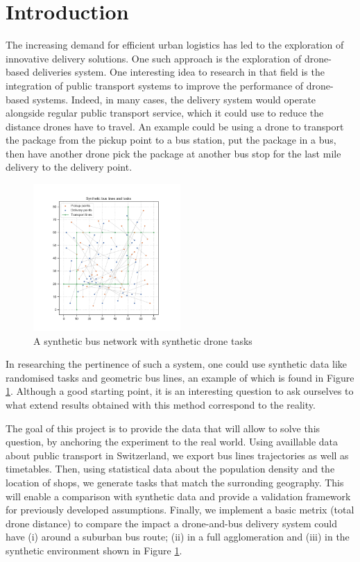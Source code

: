 \section*{Introduction}
\label{sec:introduction}

The increasing demand for efficient urban logistics has led to the exploration of innovative delivery solutions. One such approach is the exploration of drone-based deliveries system. One interesting idea to research in that field is the integration of public transport systems to improve the performance of drone-based systems. Indeed, in many cases, the delivery system would operate alongside regular public transport service, which it could use to reduce the distance drones have to travel. An example could be using a drone to transport the package from the pickup point to a bus station, put the package in a bus, then have another drone pick the package at another bus stop for the last mile delivery to the delivery point. 

\begin{figure}
    \centering
    \includegraphics[width=0.5\textwidth]{../fig/synthetic_tasks.png}
    \caption{A synthetic bus network with synthetic drone tasks}
    \label{fig:intro}
\end{figure}

In researching the pertinence of such a system, one could use synthetic data like randomised tasks and geometric bus lines, an example of which is found in Figure \ref{fig:intro}. Although a good starting point, it is an interesting question to ask ourselves to what extend results obtained with this method correspond to the reality.

The goal of this project is to provide the data that will allow to solve this question, by anchoring the experiment to the real world. Using availlable data about public transport in Switzerland, we export bus lines trajectories as well as timetables. Then, using statistical data about the population density and the location of shops, we generate tasks that match the surronding geography. This will enable a comparison with synthetic data and provide a validation framework for previously developed assumptions. Finally, we implement a basic metrix (total drone distance) to compare the impact a drone-and-bus delivery system could have (i) around a suburban bus route; (ii) in a full agglomeration and (iii) in the synthetic environment shown in Figure \ref{fig:intro}.
